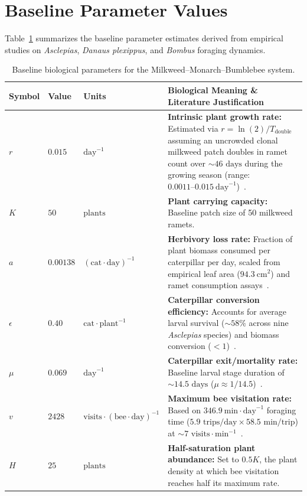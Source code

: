 \documentclass[11pt]{article}
\begin{document}
\section{Baseline Parameter Values}
Table~\ref{tab:parameters} summarizes the baseline parameter estimates derived from empirical studies on \textit{Asclepias}, \textit{Danaus plexippus}, and \textit{Bombus} foraging dynamics.

\begin{table}[htbp]
\centering
\caption{Baseline biological parameters for the Milkweed--Monarch--Bumblebee system.}
\label{tab:parameters}
\renewcommand{\arraystretch}{1.35}
\begin{tabularx}{\textwidth}{@{} l l l >{\raggedright\arraybackslash}X @{}}
\toprule
\textbf{Symbol} & \textbf{Value} & \textbf{Units} & \textbf{Biological Meaning \& Literature Justification} \\
\midrule
$r$ & $0.015$ & $\text{day}^{-1}$ & \textbf{Intrinsic plant growth rate:} Estimated via $r = \ln(2)/T_{\text{double}}$ assuming an uncrowded clonal milkweed patch doubles in ramet count over $\sim 46\text{ days}$ during the growing season (range: $0.0011\text{--}0.015\ \text{day}^{-1}$)~\cite{xerces2018}. \\
$K$ & $50$ & $\text{plants}$ & \textbf{Plant carrying capacity:} Baseline patch size of 50 milkweed ramets. \\
$a$ & $0.00138$ & $(\text{cat}\cdot\text{day})^{-1}$ & \textbf{Herbivory loss rate:} Fraction of plant biomass consumed per caterpillar per day, scaled from empirical leaf area ($94.3\ \text{cm}^2$) and ramet consumption assays~\cite{machado2023, grant2022, neupane2026}. \\
$\epsilon$ & $0.40$ & $\text{cat}\cdot\text{plant}^{-1}$ & \textbf{Caterpillar conversion efficiency:} Accounts for average larval survival ($\sim 58\%$ across nine \textit{Asclepias} species) and biomass conversion ($<1$)~\cite{pocius2018}. \\
$\mu$ & $0.069$ & $\text{day}^{-1}$ & \textbf{Caterpillar exit/mortality rate:} Baseline larval stage duration of $\sim 14.5\text{ days}$ ($\mu \approx 1/14.5$)~\cite{pocius2018}. \\
$v$ & $2428$ & $\text{visits}\cdot(\text{bee}\cdot\text{day})^{-1}$ & \textbf{Maximum bee visitation rate:} Based on $346.9\ \text{min}\cdot\text{day}^{-1}$ foraging time ($5.9\text{ trips/day} \times 58.5\text{ min/trip}$) at $\sim 7\text{ visits}\cdot\text{min}^{-1}$~\cite{minahan2018}. \\
$H$ & $25$ & $\text{plants}$ & \textbf{Half-saturation plant abundance:} Set to $0.5K$, the plant density at which bee visitation reaches half its maximum rate. \\

\end{tabularx}
\end{table}
\end{document}
